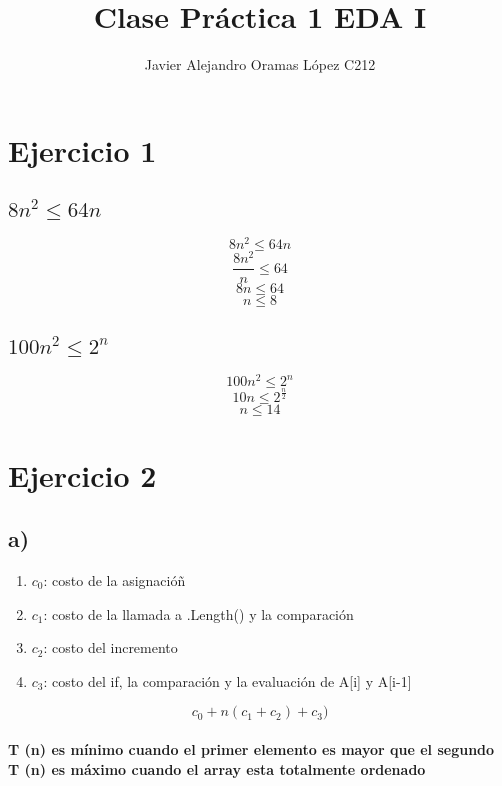 \documentclass[10pt,a4paper]{article}
\author{Javier Alejandro Oramas L\'opez C212}
\title{Clase Pr\'actica 1 EDA I}
\begin{document}
    \maketitle
    \section{Ejercicio 1}
        \subsection{ $ 8n^{2} \leq 64n $}
            \[ 8n^{2} \leq 64n \]
            \[ \frac{8n^{2}}{n} \leq 64 \]
            \[ 8n \leq 64\]
            \[ n \leq 8 \]        
         \subsection{$ 100n^2 \leq 2^n $}
            \[ 100n^2 \leq 2^n \]
            \[ 10n \leq 2^{\frac{n}{2}} \]
            \[ n \leq 14 \]            
    \section{Ejercicio 2}
        \subsection{a)}
            \begin{enumerate}
                \item $c_{0}$: costo de la asignacióñ
                \item $c_{1}$: costo de la llamada a .Length() y la comparación
                \item $c_{2}$: costo del incremento
                \item $c_{3}$: costo del if, la comparación y la evaluación de A[i] y A[i-1]
            \end{enumerate}
            \[ c_{0} + n( c_{1} + c_{2}) +c_{3})\]
            \paragraph{
                T (n) es m\'inimo cuando el primer elemento es mayor que el segundo \\
                T (n) es m\'aximo cuando el array esta totalmente ordenado
                }
\end{document}
